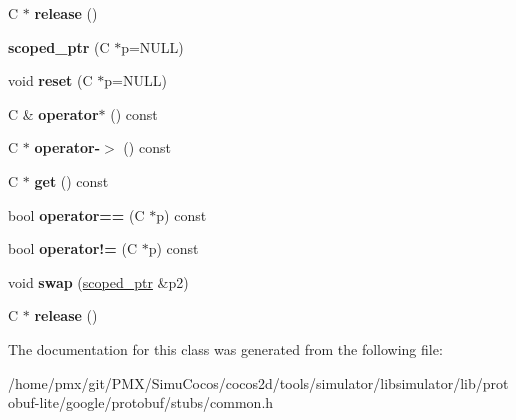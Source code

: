 \begin{DoxyCompactItemize}
\item 
\mbox{\label{classgoogle_1_1protobuf_1_1internal_1_1scoped__ptr_a2c27cc8175d977a81e0c530678d92ea0}} 
C $\ast$ {\bfseries release} ()
\item 
\mbox{\label{classgoogle_1_1protobuf_1_1internal_1_1scoped__ptr_a55642a19024b2db3f6deb6a8c9344020}} 
{\bfseries scoped\+\_\+ptr} (C $\ast$p=N\+U\+LL)
\item 
\mbox{\label{classgoogle_1_1protobuf_1_1internal_1_1scoped__ptr_a8d03754d6ed56f465edd35c7c49e5ec2}} 
void {\bfseries reset} (C $\ast$p=N\+U\+LL)
\item 
\mbox{\label{classgoogle_1_1protobuf_1_1internal_1_1scoped__ptr_adb4b7682e414944220e4032c2fa49bb9}} 
C \& {\bfseries operator$\ast$} () const
\item 
\mbox{\label{classgoogle_1_1protobuf_1_1internal_1_1scoped__ptr_a9d0ae18116459bb8a1987ccd3db90521}} 
C $\ast$ {\bfseries operator-\/$>$} () const
\item 
\mbox{\label{classgoogle_1_1protobuf_1_1internal_1_1scoped__ptr_a48f0ebcccbbd8ca630c0665489ad7113}} 
C $\ast$ {\bfseries get} () const
\item 
\mbox{\label{classgoogle_1_1protobuf_1_1internal_1_1scoped__ptr_ab5dff6b2da245968d20ff2952c9b615e}} 
bool {\bfseries operator==} (C $\ast$p) const
\item 
\mbox{\label{classgoogle_1_1protobuf_1_1internal_1_1scoped__ptr_a60aa933efbd17eae13b12ac3ed7f37cc}} 
bool {\bfseries operator!=} (C $\ast$p) const
\item 
\mbox{\label{classgoogle_1_1protobuf_1_1internal_1_1scoped__ptr_a2b851c3842dcc39b43d0f50a5dd7e72a}} 
void {\bfseries swap} (\hyperlink{classgoogle_1_1protobuf_1_1internal_1_1scoped__ptr}{scoped\+\_\+ptr} \&p2)
\item 
\mbox{\label{classgoogle_1_1protobuf_1_1internal_1_1scoped__ptr_a2c27cc8175d977a81e0c530678d92ea0}} 
C $\ast$ {\bfseries release} ()
\end{DoxyCompactItemize}


The documentation for this class was generated from the following file\+:\begin{DoxyCompactItemize}
\item 
/home/pmx/git/\+P\+M\+X/\+Simu\+Cocos/cocos2d/tools/simulator/libsimulator/lib/protobuf-\/lite/google/protobuf/stubs/common.\+h\end{DoxyCompactItemize}
